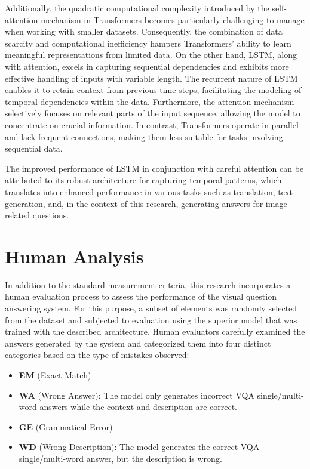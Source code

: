 \documentclass{adonis}
\begin{document}
Additionally, the quadratic computational complexity introduced by the self-attention mechanism in Transformers becomes particularly challenging to manage when working with smaller datasets. Consequently, the combination of data scarcity and computational inefficiency hampers Transformers' ability to learn meaningful representations from limited data. On the other hand, LSTM, along with attention, excels in capturing sequential dependencies and exhibits more effective handling of inputs with variable length. The recurrent nature of LSTM enables it to retain context from previous time steps, facilitating the modeling of temporal dependencies within the data. Furthermore, the attention mechanism selectively focuses on relevant parts of the input sequence, allowing the model to concentrate on crucial information. In contrast, Transformers operate in parallel and lack frequent connections, making them less suitable for tasks involving sequential data.

The improved performance of LSTM in conjunction with careful attention can be attributed to its robust architecture for capturing temporal patterns, which translates into enhanced performance in various tasks such as translation, text generation, and, in the context of this research, generating answers for image-related questions.

\section{Human Analysis}

In addition to the standard measurement criteria, this research incorporates a human evaluation process to assess the performance of the visual question answering system. For this purpose, a subset of elements was randomly selected from the dataset and subjected to evaluation using the superior model that was trained with the described architecture. Human evaluators carefully examined the answers generated by the system and categorized them into four distinct categories based on the type of mistakes observed: 

\begin{itemize}
    \item \textbf{EM} (Exact Match)
    \item \textbf{WA} (Wrong Answer): The model only generates incorrect VQA single/multi-word answers while the context and description are correct.
    \item \textbf{GE} (Grammatical Error)
    \item \textbf{WD} (Wrong Description): The model generates the correct VQA single/multi-word answer, but the description is wrong.
\end{itemize}
\end{document}
